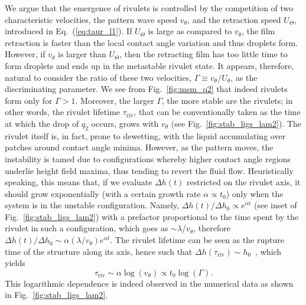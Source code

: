 We argue that the emergence of rivulets is controlled by the competition of two characteristic velocities, the pattern wave speed $v_{\theta}$, and the retraction speed $U_{\Theta}$, introduced in Eq.~(\ref{eq:taur_l1}). 
If $U_{\Theta}$ is large as compared to $v_{\theta}$, the film retraction is faster than the local contact angle variation and thus droplets form. 
However, if $v_{\theta}$ is larger than $U_{\Theta}$, then the retracting film has too little time to form droplets and ends up in the metastable rivulet state. 
It appears, therefore, natural to consider the ratio of these two velocities, $\Gamma \equiv v_{\theta}/U_{\theta}$, as the discriminating parameter.
We see from Fig.~\ref{fig:msm_q2} that indeed rivulets form only for $\Gamma > 1$. 
Moreover, the larger $\Gamma$, the more stable are the rivulets; in other words, the rivulet lifetime $\tau_{\text{riv}}$, that can be conventionally taken as the time at which the drop of $q_2$ occurs, grows with $v_{\theta}$ (see Fig.~\ref{fig:stab_ligs_lam2}).
The rivulet itself is, in fact, prone to dewetting, with the liquid accumulating over patches around contact angle minima. 
However, as the pattern moves, the instability is tamed due to configurations whereby higher contact angle regions underlie height field maxima, thus tending to revert the fluid flow.
Heuristically speaking, this means that, if we evaluate $\Delta h(t)$ restricted on the rivulet axis, it should grow exponentially (with a certain growth rate $\alpha \propto t_0$) only when the system is in the unstable configuration. 
Namely, $\Delta h(t)/\Delta h_0 \propto e^{\alpha t}$ (see inset of Fig.~\ref{fig:stab_ligs_lam2}) with a prefactor proportional to the time spent by the rivulet in such a configuration, which goes as $\sim \lambda/v_{\theta}$, therefore $\Delta h(t)/\Delta h_0 \sim \alpha (\lambda/v_{\theta})e^{\alpha t}$. 
The rivulet lifetime can be seen as the rupture time of the structure along its axis, hence such that $\Delta h (\tau_{\text{riv}}) \sim h_0$~\cite{zitzLatticeBoltzmannSimulations2021}, which yields
\begin{equation}\label{eq:rivlt}
    \tau_{\text{riv}} \sim \alpha \log(v_{\theta}) \propto t_0 \log(\Gamma). 
\end{equation}
This logarithmic dependence is indeed observed in the numerical data as shown in Fig.~\ref{fig:stab_ligs_lam2}.

